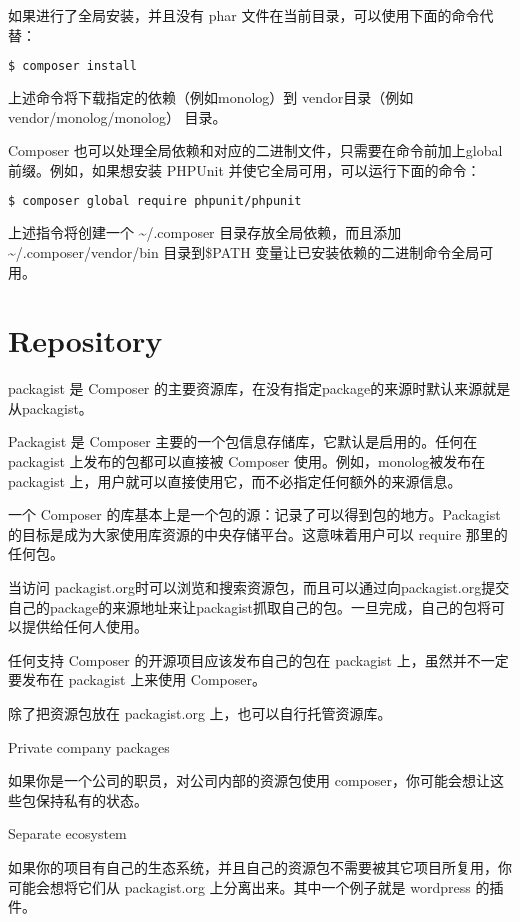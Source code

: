 如果进行了全局安装，并且没有 phar 文件在当前目录，可以使用下面的命令代替：

\begin{lstlisting}[language=bash]
$ composer install
\end{lstlisting}

上述命令将下载指定的依赖（例如monolog）到 vendor目录（例如vendor/monolog/monolog） 目录。

Composer 也可以处理全局依赖和对应的二进制文件，只需要在命令前加上global前缀。例如，如果想安装 PHPUnit 并使它全局可用，可以运行下面的命令：

\begin{lstlisting}[language=bash]
$ composer global require phpunit/phpunit
\end{lstlisting}

上述指令将创建一个 \~{}/.composer 目录存放全局依赖，而且添加\~{}/.composer/vendor/bin 目录到\$PATH 变量让已安装依赖的二进制命令全局可用。


\section{Repository}

packagist 是 Composer 的主要资源库，在没有指定package的来源时默认来源就是从packagist。

Packagist 是 Composer 主要的一个包信息存储库，它默认是启用的。任何在 packagist 上发布的包都可以直接被 Composer 使用。例如，monolog被发布在 packagist 上，用户就可以直接使用它，而不必指定任何额外的来源信息。

一个 Composer 的库基本上是一个包的源：记录了可以得到包的地方。Packagist 的目标是成为大家使用库资源的中央存储平台。这意味着用户可以 require 那里的任何包。

当访问 packagist.org时可以浏览和搜索资源包，而且可以通过向packagist.org提交自己的package的来源地址来让packagist抓取自己的包。一旦完成，自己的包将可以提供给任何人使用。

任何支持 Composer 的开源项目应该发布自己的包在 packagist 上，虽然并不一定要发布在 packagist 上来使用 Composer。

除了把资源包放在 packagist.org 上，也可以自行托管资源库。

\begin{compactitem}
\item Private company packages

如果你是一个公司的职员，对公司内部的资源包使用 composer，你可能会想让这些包保持私有的状态。

\item Separate ecosystem

如果你的项目有自己的生态系统，并且自己的资源包不需要被其它项目所复用，你可能会想将它们从 packagist.org 上分离出来。其中一个例子就是 wordpress 的插件。
\end{compactitem}


